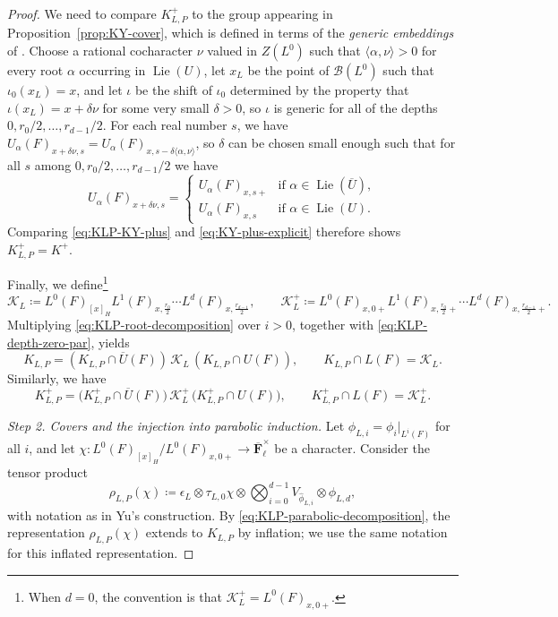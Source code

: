 \documentclass[reqno]{amsart}
\numberwithin{equation}{subsection}
\newcommand{\F}{\mathbf{F}}
\newcommand{\ol}[1]{\overline{#1}}
\newcommand{\wh}[1]{\widehat{#1}}
\newcommand{\co}{\colon}
\newcommand\cB{\mathcal{B}}
\newcommand\cK{\mathcal{K}}
\DeclareMathOperator{\Lie}{Lie}
\theoremstyle{remark}
\numberwithin{equation}{subsection}
\numberwithin{figure}{subsection}
\begin{document}
\begin{proof}
We need to compare $K_{L,P}^+$ to the group appearing in Proposition~\ref{prop:KY-cover}, which is defined in terms of the \emph{generic embeddings} of \cite{KY17}. Choose a rational cocharacter $\nu$ valued in $Z(L^0)$ such that $\langle\alpha, \nu\rangle > 0$ for every root $\alpha$ occurring in $\Lie(U)$, let $x_L$ be the point of $\cB(L^0)$ such that $\iota_0(x_L) = x$, and let $\iota$ be the shift of $\iota_0$ determined by the property that $\iota(x_L) = x + \delta \nu$ for some very small $\delta > 0$, so $\iota$ is generic for all of the depths $0, r_0/2, \dots, r_{d-1}/2$. For each real number $s$, we have $U_\alpha(F)_{x+\delta\nu,s} = U_\alpha(F)_{x,s-\delta\langle\alpha, \nu\rangle}$, so $\delta$ can be chosen small enough such that for all $s$ among $0, r_0/2, \dots, r_{d-1}/2$ we have 
\[
U_\alpha(F)_{x+\delta\nu, s} = \begin{cases}
U_\alpha(F)_{x,s+} &\text{if } \alpha \in \Lie(\ol U), \\
U_\alpha(F)_{x,s} &\text{if } \alpha \in \Lie(U).
\end{cases}
\]
Comparing \eqref{eq:KLP-KY-plus} and \eqref{eq:KY-plus-explicit} therefore shows $K^+_{L,P} = K^+$.



Finally, we define\footnote{When \(d=0\), the convention is that \(\cK_L^+=L^0(F)_{x,0+}\).}
\[
\cK_L \coloneqq L^0(F)_{[x]_H}L^1(F)_{x,\frac{r_0}{2}} \cdots L^d(F)_{x,\frac{r_{d-1}}{2}},
\qquad
\cK_L^+\coloneqq L^0(F)_{x,0+}L^1(F)_{x,\frac{r_0}{2}+}\cdots
L^d(F)_{x,\frac{r_{d-1}}{2}+}.
\]
Multiplying \eqref{eq:KLP-root-decomposition} over \(i>0\), together with
\eqref{eq:KLP-depth-zero-par}, yields
\begin{equation}\label{eq:KLP-parabolic-decomposition}
K_{L,P}= (K_{L,P}\cap\ol U(F))\,\cK_L\,(K_{L,P}\cap U(F)),
\qquad
K_{L,P}\cap L(F)=\cK_L.
\end{equation}
Similarly, we have
\begin{equation}\label{eq:KLP-KY-plus-parabolic-decomposition}
K_{L,P}^+
=
\bigl(K_{L,P}^+\cap\ol U(F)\bigr)\,
\cK_L^+\,
\bigl(K_{L,P}^+\cap U(F)\bigr),
\qquad
K_{L,P}^+\cap L(F)=\cK_L^+.
\end{equation}

\emph{Step 2. Covers and the injection into parabolic induction.} Let $\phi_{L,i} = \phi_i|_{L^i(F)}$ for all $i$, and let $\chi\co L^0(F)_{[x]_H}/L^0(F)_{x,0+} \to \ol\F_\ell^\times$ be a character. Consider the tensor product
\[
\rho_{L,P}(\chi) \coloneqq \epsilon_L \otimes \tau_{L,0}\chi \otimes \bigotimes_{i=0}^{d-1} V_{\wh \phi_{L,i}} \otimes \phi_{L,d},
\]
with notation as in Yu's construction. By \eqref{eq:KLP-parabolic-decomposition}, the representation $\rho_{L,P}(\chi)$ extends to $K_{L,P}$ by inflation; we use the same notation for this inflated representation. 


\end{proof}
\end{document}
